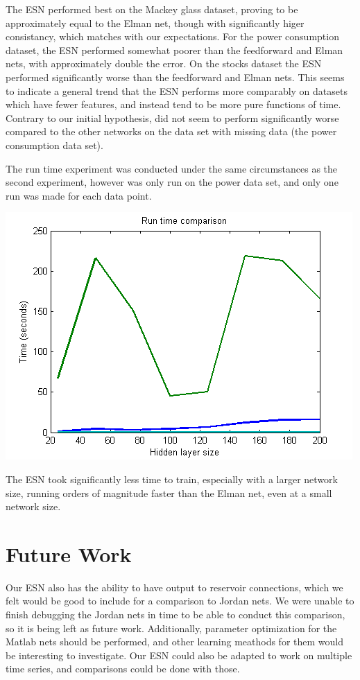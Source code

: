 \documentclass{acm_proc_article-sp}
\begin{document}
The ESN performed best on the Mackey glass dataset, proving to be approximately equal to the Elman net, though with significantly higer consistancy, which matches with our expectations. For the power consumption dataset, the ESN performed somewhat poorer than the feedforward and Elman nets, with approximately double the error. On the stocks dataset the ESN performed significantly worse than the feedforward and Elman nets. This seems to indicate a general trend that the ESN performs more comparably on datasets which have fewer features, and instead tend to be more pure functions of time. Contrary to our initial hypothesis, did not seem to perform significantly worse compared to the other networks on the data set with missing data (the power consumption data set). 

The run time experiment was conducted under the same circumstances as the second experiment, however was only run on the power data set, and only one run was made for each data point.

\includegraphics[scale=0.7]{time_plot.png}

The ESN took significantly less time to train, especially with a larger network size, running orders of magnitude faster than the Elman net, even at a small network size.

\section{Future Work}
Our ESN also has the ability to have output to reservoir connections, which we felt would be good to include for a comparison to Jordan nets. We were unable to finish debugging the Jordan nets in time to be able to conduct this comparison, so it is being left as future work. Additionally, parameter optimization for the Matlab nets should be performed, and other learning meathods for them would be interesting to investigate. Our ESN could also be adapted to work on multiple time series, and comparisons could be done with those.  
\end{document}
